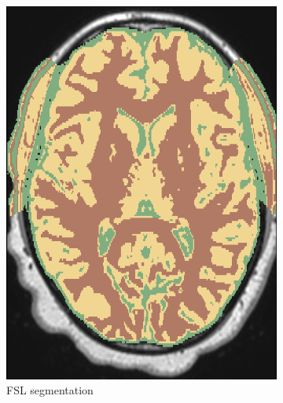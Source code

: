 \documentclass{standalone}
\begin{document}
\begin{figure}[H]
\begin{subfigure}[b]{0.325\textwidth}
             \includegraphics[scale=0.25]{img/Chap3/FSL_SEG54.png}
             \caption{FSL segmentation}
        \end{subfigure}
        \hfill
        \begin{subfigure}[b]{0.325\textwidth}

\end{subfigure}
\end{figure}
\end{document}
